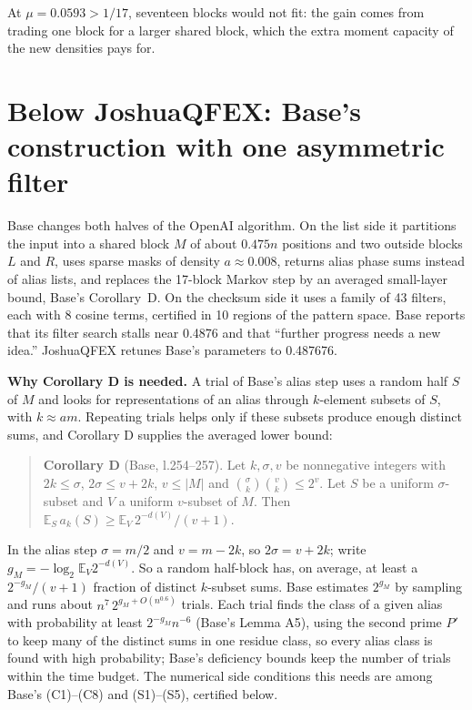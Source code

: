\documentclass[11pt]{article}
\newcommand{\E}{\mathbb{E}}
\theoremstyle{plain}
\begin{document}
At $\mu = 0.0593 > 1/17$, seventeen blocks would not fit: the gain comes from trading one block for a larger shared block, which the extra moment capacity of the new densities pays for.

\section{Below JoshuaQFEX: Base's construction with one asymmetric filter}

Base changes both halves of the OpenAI algorithm. On the list side it partitions the input into a shared block $M$ of about $0.475n$ positions and two outside blocks $L$ and $R$, uses sparse masks of density $a \approx 0.008$, returns alias phase sums instead of alias lists, and replaces the 17-block Markov step by an averaged small-layer bound, Base's Corollary~D. On the checksum side it uses a family of 43 filters, each with 8 cosine terms, certified in 10 regions of the pattern space. Base reports that its filter search stalls near 0.4876 and that ``further progress needs a new idea.'' JoshuaQFEX retunes Base's parameters to 0.487676.

\textbf{Why Corollary D is needed.} A trial of Base's alias step uses a random half $S$ of $M$ and looks for representations of an alias through $k$-element subsets of $S$, with $k \approx am$. Repeating trials helps only if these subsets produce enough distinct sums, and Corollary D supplies the averaged lower bound:

\begin{quote}
\textbf{Corollary D} (Base, l.254--257). Let $k, \sigma, v$ be nonnegative integers with $2k \le \sigma$, $2\sigma \le v + 2k$, $v \le |M|$ and $\binom{\sigma}{k}\binom{v}{k} \le 2^v$. Let $S$ be a uniform $\sigma$-subset and $V$ a uniform $v$-subset of $M$. Then $\E_S\, a_k(S) \ge \E_V\, 2^{-d(V)}/(v+1)$.
\end{quote}

In the alias step $\sigma = m/2$ and $v = m - 2k$, so $2\sigma = v + 2k$; write $g_M = -\log_2 \E_V 2^{-d(V)}$. So a random half-block has, on average, at least a $2^{-g_M}/(v+1)$ fraction of distinct $k$-subset sums. Base estimates $2^{g_M}$ by sampling and runs about $n^7\, 2^{g_M + O(n^{0.6})}$ trials. Each trial finds the class of a given alias with probability at least $2^{-g_M} n^{-6}$ (Base's Lemma A5), using the second prime $P'$ to keep many of the distinct sums in one residue class, so every alias class is found with high probability; Base's deficiency bounds keep the number of trials within the time budget. The numerical side conditions this needs are among Base's (C1)--(C8) and (S1)--(S5), certified below.
\end{document}
